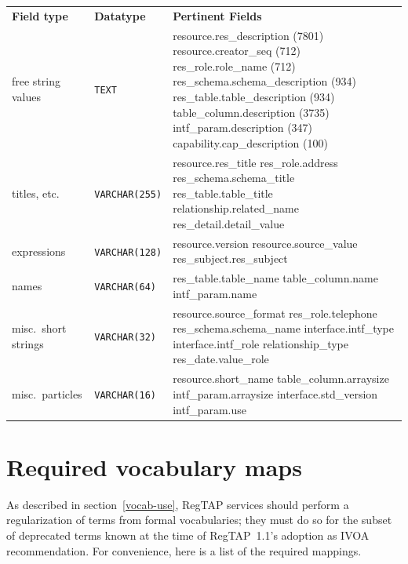 \documentclass[11pt,a4paper]{ivoa}
\begin{document}
\begin{inlinetable}
\begin{tabular}{llp{6cm}}
\sptablerule
\textbf{Field type}&
\textbf{Datatype}&
\textbf{Pertinent Fields}\\
\sptablerule
free string values&\texttt{TEXT}&resource.res\_description
(7801)\hfil\break
          resource.creator\_seq (712)\hfil\break
          res\_role.role\_name (712)\hfil\break
          res\_schema.schema\_description (934)\hfil\break
          res\_table.table\_description (934)\hfil\break
          table\_column.description (3735)\hfil\break
          intf\_param.description (347)\hfil\break
          capability.cap\_description (100)\\
\sptablerule
titles, etc.&\texttt{VARCHAR(255)}&resource.res\_title\hfil\break
          res\_role.address\hfil\break
          res\_schema.schema\_title\hfil\break
          res\_table.table\_title\hfil\break
          relationship.related\_name\hfil\break
          res\_detail.detail\_value\\
\sptablerule
expressions&\texttt{VARCHAR(128)}&resource.version\hfil\break
          resource.source\_value\hfil\break
          res\_subject.res\_subject\\
\sptablerule
names&\texttt{VARCHAR(64)}&res\_table.table\_name\hfil\break
          table\_column.name\hfil\break
          intf\_param.name\\
\sptablerule
misc.~short strings&\texttt{VARCHAR(32)}&resource.source\_format\hfil\break
          res\_role.telephone\hfil\break
          res\_schema.schema\_name\hfil\break
          interface.intf\_type\hfil\break
          interface.intf\_role\hfil\break
          relationship\_type\hfil\break
          res\_date.value\_role\\
\sptablerule
misc.~particles&\texttt{VARCHAR(16)}&resource.short\_name\hfil\break
          table\_column.arraysize\hfil\break
          intf\_param.arraysize\hfil\break
          interface.std\_version\hfil\break
          intf\_param.use\\
\end{tabular}
\end{inlinetable}


\section{Required vocabulary maps}
\label{app:voctrans}

As described in section~\ref{vocab-use}, RegTAP services should perform
a regularization of terms from formal vocabularies; they must do so for
the subset of deprecated terms known at the time of RegTAP~1.1's
adoption as IVOA recommendation.  For convenience, here is a list of the
required mappings.
\end{document}

